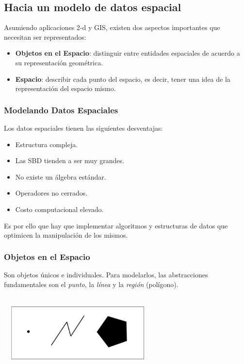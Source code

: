 \documentclass[a4paper,12pt,oneside]{report}
\begin{document}
\subsection*{Hacia un modelo de datos espacial}
Asumiendo aplicaciones 2-d y GIS, existen dos aspectos importantes que necesitan ser representados:\\
\begin{itemize}
\item \textbf{Objetos en el Espacio}: distinguir entre entidades espaciales de acuerdo a su representaci\'on geom\'etrica.
\item \textbf{Espacio}: describir cada punto del espacio, es decir, tener una idea de la representaci\'on del espacio mismo.
\end{itemize}
\subsubsection*{Modelando Datos Espaciales}
Los datos espaciales tienen las siguientes desventajas:
\begin{itemize}
\item Estructura compleja.
\item Las SBD tienden a ser muy grandes.
\item No existe un \'algebra est\'andar.
\item Operadores no cerrados.
\item Costo computacional elevado.
\end{itemize}
Es por ello que hay que implementar algoritmos y estructuras de datos que optimicen la manipulaci\'on de los mismos.
\subsubsection*{Objetos en el Espacio}
Son objetos \'unicos e individuales. Para modelarlos, las abstracciones fundamentales son el \textit{punto}, la \textit{l\'inea} y la \textit{regi\'on} (pol\'igono).\\
\ \\
\begin{center}\includegraphics[width=8cm,height=3cm]{Imagenes/figurasgeom.png}
\end{center}
\end{document}
